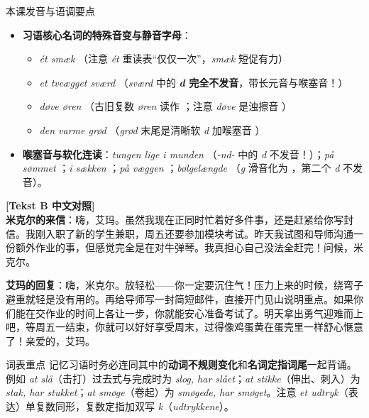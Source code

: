\begin{tipbox}{本课发音与语调要点}
\begin{itemize}
  \item \textbf{习语核心名词的特殊音变与静音字母}：
    \begin{itemize}
      \item \textit{ét smæk} （注意 \textit{ét} 重读表“仅仅一次”，\textit{smæk} 短促有力）
      \item \textit{et tveægget sværd} （\textit{sværd} 中的 \textbf{\textit{d} 完全不发音}，带长元音与喉塞音！）
      \item \textit{døve øren} （古旧复数 \textit{øren} 读作 ；注意 \textit{døve} 是浊擦音 ）
      \item \textit{den varme grød} （\textit{grød} 末尾是清晰软 \textit{d} 加喉塞音 ）
    \end{itemize}
  \item \textbf{喉塞音与软化连读}：\textit{tungen lige i munden} （\textit{-nd-} 中的 \textit{d} 不发音！）；\textit{på sømmet} ；\textit{i sækken} ；\textit{på væggen} ；\textit{bølgelængde} （\textit{g} 滑音化为 ，第二个 \textit{d} 不发音）。
\end{itemize}
\end{tipbox}

\begin{transbox}
\small
\textbf{\color{NCDTeal}[Tekst B 中文对照]}\\
\textbf{米克尔的来信}：嗨，艾玛。虽然我现在正同时忙着好多件事，还是赶紧给你写封信。我刚入职了新的学生兼职，周五还要参加模块考试。昨天我试图和导师沟通一份额外作业的事，但感觉完全是在对牛弹琴。我真担心自己没法全赶完！问候，米克尔。

\textbf{艾玛的回复}：嗨，米克尔。放轻松——你一定要沉住气！压力上来的时候，绕弯子避重就轻是没有用的。再给导师写一封简短邮件，直接开门见山说明重点。如果你们能在交作业的时间上各让一步，你就能安心准备考试了。明天拿出勇气迎难而上吧，等周五一结束，你就可以好好享受周末，过得像鸡蛋黄在蛋壳里一样舒心惬意了！亲爱的，艾玛。
\end{transbox}


\begin{tipbox}{词表重点}
记忆习语时务必连同其中的\textbf{动词不规则变化}和\textbf{名词定指词尾}一起背诵。例如 \textit{at slå}（击打）过去式与完成时为 \textit{slog, har slået}；\textit{at stikke}（伸出、刺入）为 \textit{stak, har stukket}；\textit{at smøge}（卷起）为 \textit{smøgede, har smøget}。注意 \textit{et udtryk}（表达）单复数同形，复数定指加双写 \textit{k}（\textit{udtrykkene}）。
\end{tipbox}

